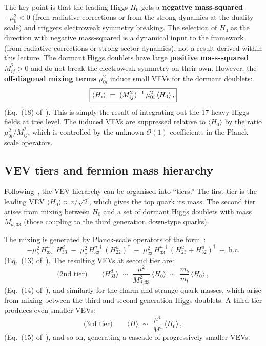 \documentclass[11pt,a4paper]{article}
\begin{document}
The key point is that the leading Higgs $H_0$ gets a
\textbf{negative mass-squared} $-\mu_0^2 < 0$ (from radiative
corrections or from the strong dynamics at the duality scale) and
triggers electroweak symmetry breaking.
The selection of $H_0$ as the direction with negative mass-squared is a dynamical input to the framework (from radiative corrections or strong-sector dynamics), not a result derived within this lecture.  The dormant Higgs doublets
have large \textbf{positive mass-squared} $M_{ij}^2 > 0$ and do not
break the electroweak symmetry on their own.  However, the
\textbf{off-diagonal mixing terms} $\mu_{0i}^2$ induce small VEVs for
the dormant doublets:
\begin{equation}\label{eq:induced-vev}
  \boxed{%
  \langle H_i \rangle
  \;=\; (M_{ij}^2)^{-1}\, \mu_{0i}^2\, \langle H_0 \rangle\,,}
\end{equation}
(Eq.~(18) of~\cite{CacciapagliaSannino2024}).
This is simply the result of integrating out the 17 heavy Higgs fields
at tree level.  The induced VEVs are suppressed relative to
$\langle H_0 \rangle$ by the ratio $\mu_{0i}^2 / M_{ij}^2$, which is
controlled by the unknown $\mathcal{O}(1)$ coefficients in the
Planck-scale operators.

\subsection{VEV tiers and fermion mass hierarchy}

Following~\cite{CacciapagliaSannino2024}, the VEV hierarchy can be
organised into ``tiers.''  The first tier is the leading VEV
$\langle H_0 \rangle \approx v/\sqrt{2}$, which gives the top quark its
mass.
The second tier arises from mixing between $H_0$ and a set of dormant
Higgs doublets with mass $M_{d,33}$ (those coupling to the third
generation down-type quarks).

The mixing is generated by Planck-scale operators of the
form~\cite{CacciapagliaSannino2024}:
\begin{equation}\label{eq:mixing-2nd-tier}
  -\mu_b^2\, H_{33}^{u\,\dagger} H_{33}^d
  \;-\; \mu_c^2\, H_{33}^{u\,\dagger} (H_{22}^u)^\dagger
  \;-\; \mu_{23}^2\, H_{33}^{u\,\dagger} (H_{23}^u + H_{32}^u)^\dagger
  \;+\; \text{h.c.}
\end{equation}
(Eq.~(13) of~\cite{CacciapagliaSannino2024}).  The resulting VEVs at
second tier are:
\begin{equation}\label{eq:2nd-tier-vev}
  \text{(2nd tier)}\qquad
  \langle H_{33}^d \rangle
  \;\sim\; \frac{\mu^2}{M_{d,33}^2}\, \langle H_0 \rangle
  \;\sim\; \frac{m_b}{m_t}\, \langle H_0 \rangle\,,
\end{equation}
(Eq.~(14) of~\cite{CacciapagliaSannino2024}),
and similarly for the charm and strange quark masses, which arise from
mixing between the third and second generation Higgs doublets.  A third
tier produces even smaller VEVs:
\begin{equation}\label{eq:3rd-tier-vev}
  \text{(3rd tier)}\qquad
  \langle H \rangle
  \;\sim\; \frac{\mu^4}{M^4}\, \langle H_0 \rangle\,,
\end{equation}
(Eq.~(15) of~\cite{CacciapagliaSannino2024}),
and so on, generating a cascade of progressively smaller VEVs.
\end{document}
